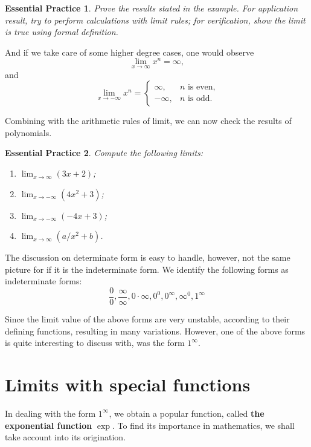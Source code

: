 \documentclass[12pt]{article}
\newtheorem{exercise}{Essential Practice}[section]
\begin{document}
    \begin{exercise}
        Prove the results stated in the example. For application result, try to perform calculations with limit rules; for verification, show the limit is true using formal definition.
    \end{exercise}

    And if we take care of some higher degree cases, one would observe \[\lim_{x\to \infty}x^n = \infty,\] and \[\lim_{x\to -\infty}x^n = \begin{cases}
        \infty, &n\textrm{ is even,}\\
        -\infty, &n\textrm{ is odd.}
    \end{cases}\]

    Combining with the arithmetic rules of limit, we can now check the results of polynomials.

    \begin{exercise}
        Compute the following limits:\begin{enumerate}
            \item $\displaystyle\lim_{x\to \infty}(3x+2)$;
            \item $\displaystyle\lim_{x\to -\infty}(4x^2+3)$;
            \item $\displaystyle\lim_{x\to -\infty}(-4x+3)$;
            \item $\displaystyle\lim_{x\to \infty}(a/x^2+b)$.
        \end{enumerate}
    \end{exercise}

    The discussion on determinate form is easy to handle, however, not the same picture for if it is the indeterminate form. We identify the following forms as indeterminate forms: \[\frac{0}{0}, \frac{\infty}{\infty}, 0\cdot \infty, 0^0, 0^\infty, \infty^0, 1^\infty\]

    Since the limit value of the above forms are very unstable, according to their defining functions, resulting in many variations. However, one of the above forms is quite interesting to discuss with, was the form $1^\infty$.
    \section{Limits with special functions}

    In dealing with the form $1^\infty$, we obtain a popular function, called \textbf{the exponential function} $\exp$. To find its importance in mathematics, we shall take account into its origination.
\end{document}
